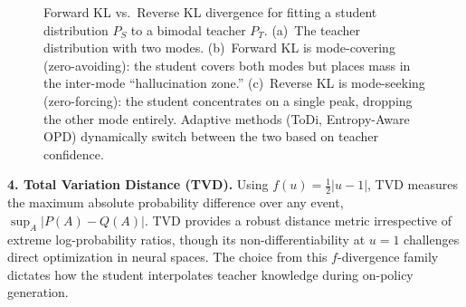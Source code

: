 \documentclass{article} %
\begin{document}
\begin{figure}[t]
{
}
    \caption{Forward KL vs.\ Reverse KL divergence for fitting a student distribution $P_S$ to a bimodal teacher $P_T$. (a)~The teacher distribution with two modes. (b)~Forward KL is mode-covering (zero-avoiding): the student covers both modes but places mass in the inter-mode ``hallucination zone.'' (c)~Reverse KL is mode-seeking (zero-forcing): the student concentrates on a single peak, dropping the other mode entirely. Adaptive methods (ToDi, Entropy-Aware OPD) dynamically switch between the two based on teacher confidence.}
    \label{fig:forward_vs_reverse_kl}
\end{figure}

\textbf{4. Total Variation Distance (TVD).} Using $f(u) = \frac{1}{2}|u-1|$, TVD measures the maximum absolute probability difference over any event, $\sup_{A} |P(A) - Q(A)|$. TVD provides a robust distance metric irrespective of extreme log-probability ratios, though its non-differentiability at $u=1$ challenges direct optimization in neural spaces. The choice from this $f$-divergence family dictates how the student interpolates teacher knowledge during on-policy generation.
\end{document}
